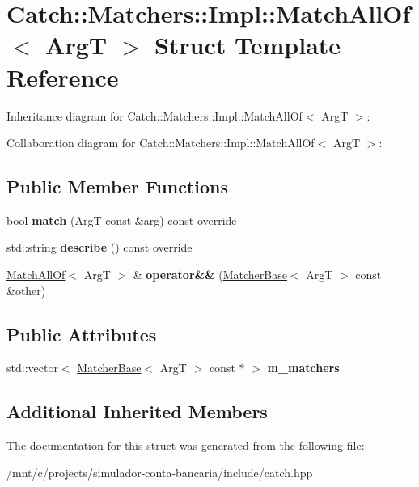 \hypertarget{structCatch_1_1Matchers_1_1Impl_1_1MatchAllOf}{}\section{Catch\+:\+:Matchers\+:\+:Impl\+:\+:Match\+All\+Of$<$ ArgT $>$ Struct Template Reference}
\label{structCatch_1_1Matchers_1_1Impl_1_1MatchAllOf}


Inheritance diagram for Catch\+:\+:Matchers\+:\+:Impl\+:\+:Match\+All\+Of$<$ ArgT $>$\+:


Collaboration diagram for Catch\+:\+:Matchers\+:\+:Impl\+:\+:Match\+All\+Of$<$ ArgT $>$\+:
\subsection*{Public Member Functions}
\begin{DoxyCompactItemize}
\item 
\mbox{\label{structCatch_1_1Matchers_1_1Impl_1_1MatchAllOf_acfb377bda2c58ae62e6df9c3a8a89f8f}} 
bool {\bfseries match} (ArgT const \&arg) const override
\item 
\mbox{\label{structCatch_1_1Matchers_1_1Impl_1_1MatchAllOf_acbb9a083e93b546fd33c9235b644c40f}} 
std\+::string {\bfseries describe} () const override
\item 
\mbox{\label{structCatch_1_1Matchers_1_1Impl_1_1MatchAllOf_a9d0e38b36474336498d627610db434f3}} 
\hyperlink{structCatch_1_1Matchers_1_1Impl_1_1MatchAllOf}{Match\+All\+Of}$<$ ArgT $>$ \& {\bfseries operator\&\&} (\hyperlink{structCatch_1_1Matchers_1_1Impl_1_1MatcherBase}{Matcher\+Base}$<$ ArgT $>$ const \&other)
\end{DoxyCompactItemize}
\subsection*{Public Attributes}
\begin{DoxyCompactItemize}
\item 
\mbox{\label{structCatch_1_1Matchers_1_1Impl_1_1MatchAllOf_a98d6a2611f195a4a5c49f92fd877be9a}} 
std\+::vector$<$ \hyperlink{structCatch_1_1Matchers_1_1Impl_1_1MatcherBase}{Matcher\+Base}$<$ ArgT $>$ const  $\ast$ $>$ {\bfseries m\+\_\+matchers}
\end{DoxyCompactItemize}
\subsection*{Additional Inherited Members}


The documentation for this struct was generated from the following file\+:\begin{DoxyCompactItemize}
\item 
/mnt/c/projects/simulador-\/conta-\/bancaria/include/catch.\+hpp\end{DoxyCompactItemize}
